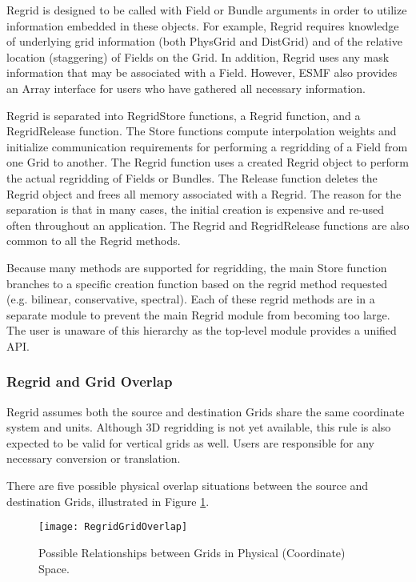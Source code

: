 

Regrid is designed to be called with Field or Bundle
arguments in order to utilize information embedded in
these objects.  For example, Regrid requires knowledge
of underlying grid information (both PhysGrid and DistGrid)
and of the relative location (staggering) of Fields on
the Grid.  In addition, Regrid uses any mask information
that may be associated with a Field.  However, ESMF also
provides an Array interface for users who have gathered all
necessary information.

Regrid is separated into RegridStore functions, a Regrid
function, and a RegridRelease function. The Store functions
compute interpolation weights and initialize communication
requirements for performing a regridding of a Field
from one Grid to another.  The Regrid function uses
a created Regrid object to perform the actual regridding
of Fields or Bundles.  The Release function deletes the
Regrid object and frees all memory associated with a Regrid.
The reason for the separation is that in many cases, the
initial creation is expensive and re-used often throughout
an application.  The Regrid and RegridRelease functions are
also common to all the Regrid methods.

Because many methods are supported for regridding,
the main Store function branches to a specific
creation function based on the regrid method requested
(e.g. bilinear, conservative, spectral).  Each of
these regrid methods are in a separate module to
prevent the main Regrid module from becoming too
large.  The user is unaware of this hierarchy as the
top-level module provides a unified API.

\subsubsection{Regrid and Grid Overlap}

Regrid assumes both the source and destination Grids share the same coordinate
system and units.  Although 3D regridding is not yet available, this rule is
also expected to be valid for vertical grids as well.  Users are responsible
for any necessary conversion or translation.

There are five possible physical overlap situations between the source and
destination Grids, illustrated in Figure \ref{fig:RegridGridOverlap}.

\begin{center}
\begin{figure}
\caption{Possible Relationships between Grids in Physical (Coordinate) Space. }
\label{fig:RegridGridOverlap}
\resizebox{\textwidth}{!}
  {\texttt{[image: RegridGridOverlap]}}
\end{figure}
\end{center}

